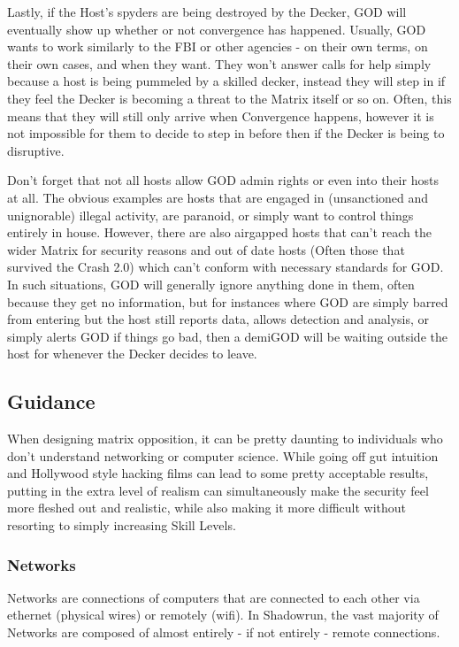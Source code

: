 \begin{multicols}{3}
	Lastly, if the Host's spyders are being destroyed by the Decker, GOD will eventually show up whether or not convergence has happened. Usually, GOD wants to work similarly to the FBI or other agencies - on their own terms, on their own cases, and when they want. They won't answer calls for help simply because a host is being pummeled by a skilled decker, instead they will step in if they feel the Decker is becoming a threat to the Matrix itself or so on. Often, this means that they will still only arrive when Convergence happens, however it is not impossible for them to decide to step in before then if the Decker is being to disruptive.
	
	Don't forget that not all hosts allow GOD admin rights or even into their hosts at all. The obvious examples are hosts that are engaged in (unsanctioned and unignorable) illegal activity, are paranoid, or simply want to control things entirely in house. However, there are also airgapped hosts that can't reach the wider Matrix for security reasons and out of date hosts (Often those that survived the Crash 2.0) which can't conform with necessary standards for GOD. In such situations, GOD will generally ignore anything done in them, often because they get no information, but for instances where GOD are simply barred from entering but the host still reports data, allows detection and analysis, or simply alerts GOD if things go bad, then a demiGOD will be waiting outside the host for whenever the Decker decides to leave.
	
	\subsection{Guidance}
	
	When designing matrix opposition, it can be pretty daunting to individuals who don't understand networking or computer science. While going off gut intuition and Hollywood style hacking films can lead to some pretty acceptable results, putting in the extra level of realism can simultaneously make the security feel more fleshed out and realistic, while also making it more difficult without resorting to simply increasing Skill Levels.
	
	\subsubsection{Networks}
	
	Networks are connections of computers that are connected to each other via ethernet (physical wires) or remotely (wifi). In Shadowrun, the vast majority of Networks are composed of almost entirely - if not entirely - remote connections. 
	

\end{multicols}
